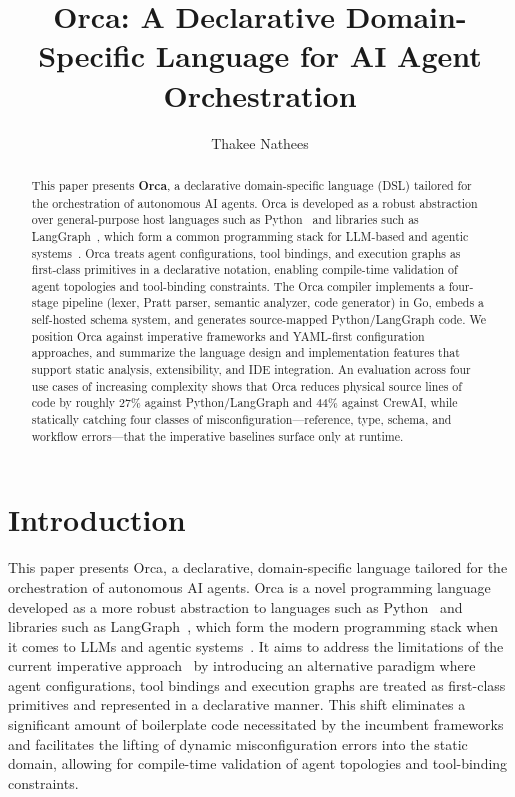 \documentclass[sigconf,nonacm]{acmart}
\title{Orca: A Declarative Domain-Specific Language for AI Agent Orchestration}
\author{Thakee Nathees}
\affiliation{%
  \institution{Curtin University}
  \department{Department of Computing}
  \city{Perth}
  \country{Australia}
}
\begin{document}
\begin{abstract}
This paper presents \textbf{Orca}, a declarative domain-specific language
(DSL) tailored for the orchestration of autonomous AI agents. Orca is
developed as a robust abstraction over general-purpose host languages such
as Python~\cite{vanrossum2009python} and libraries such as
LangGraph~\cite{langgraph2024}, which form a common programming stack for
LLM-based and agentic systems~\cite{crewai2024,autogen2024}. Orca treats
agent configurations, tool bindings, and execution graphs as first-class
primitives in a declarative notation, enabling compile-time validation of
agent topologies and tool-binding constraints. The Orca compiler implements
a four-stage pipeline (lexer, Pratt parser, semantic analyzer, code
generator) in Go, embeds a self-hosted schema system, and generates
source-mapped Python/LangGraph code. We position Orca against imperative
frameworks and YAML-first configuration approaches, and summarize the
language design and implementation features that support static analysis,
extensibility, and IDE integration. An evaluation across four use cases of
increasing complexity shows that Orca reduces physical source lines of
code by roughly $27\%$ against Python/LangGraph and $44\%$ against
CrewAI, while statically catching four classes of
misconfiguration---reference, type, schema, and workflow
errors---that the imperative baselines surface only at runtime.
\end{abstract}

\maketitle

\section{Introduction}
\label{sec:intro}

This paper presents Orca, a declarative, domain-specific language tailored
for the orchestration of autonomous AI agents. Orca is a novel programming
language developed as a more robust abstraction to languages such as
Python~\cite{vanrossum2009python} and libraries such as
LangGraph~\cite{langgraph2024}, which form the modern programming stack when
it comes to LLMs and agentic systems~\cite{crewai2024,autogen2024}. It aims
to address the limitations of the current imperative
approach~\cite{docker2025cagent} by introducing an alternative paradigm
where agent configurations, tool bindings and execution graphs are treated
as first-class primitives and represented in a declarative manner. This
shift eliminates a significant amount of boilerplate code necessitated by
the incumbent frameworks and facilitates the lifting of dynamic
misconfiguration errors into the static domain, allowing for compile-time
validation of agent topologies and tool-binding constraints.
\end{document}
